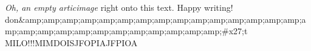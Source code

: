 \textit{Oh, an empty articimage} right onto this text. Happy writing! 
don&amp;amp;amp;amp;amp;amp;amp;amp;amp;amp;amp;amp;amp;amp;amp;amp;amp;amp;amp;amp;amp;amp;amp;amp;amp;amp;amp;#x27;t MILO!!!MIMDOISJFOPIAJFPIOA